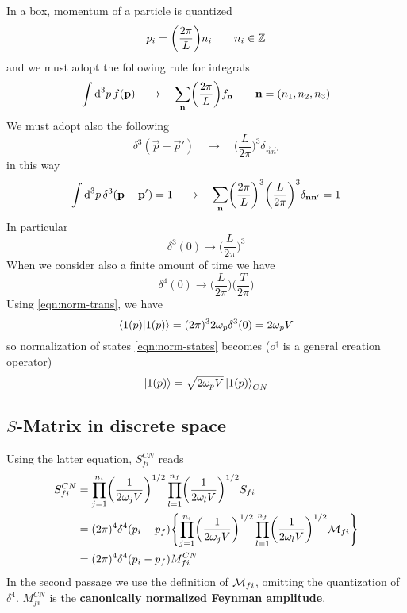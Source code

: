 \documentclass[TheoreticalPhy_ModB.tex]{subfiles}
\begin{document}
In a box, momentum of a particle is quantized
\[
p_i = \biggl( \frac{2 \pi}{L} \biggr) n_i \qquad n_i \in \mathbb{Z}
\]
and we must adopt the following rule for integrals
\[
\int \textup{d}^3 p \, f(\mathbf{p}) \quad \to \quad \sum_{\mathbf{n}} \biggr( \frac{2 \pi}{L} \biggl) f_{\mathbf{n}}
\qquad \mathbf{n} = (n_1, n_2, n_3)
\]
We must adopt also the following
\[
\delta^3 (\vec{p} - \vec{p}')
\quad \to \quad
\biggl( \frac{L}{2 \pi} \biggr)^3 \delta_{\vec{n}\vec{n}'}
\]
in this way
\[
\int \textup{d}^3p \, \delta^3 (\mathbf{p} - \mathbf{p}') = 1
\quad \to \quad
\sum_{\mathbf{n}} \biggl( \frac{2 \pi}{L} \biggr)^3 \biggl( \frac{L}{2 \pi} \biggr)^3 \delta_{\mathbf{n}\mathbf{n}'} = 1
\]
In particular
\[
\delta^3(0) \to \biggl( \frac{L}{2 \pi} \biggr)^3 
\]
When we consider also a finite amount of time we have
\[
\delta^4 (0) \to \biggl( \frac{L}{2 \pi} \biggr) \biggl( \frac{T}{2 \pi} \biggr)
\]
Using \eqref{eqn:norm-trans}, we have
\[
\braket{1(p)}{1(p)} = (2 \pi)^3 2 \omega_p \delta^3(0) = 2 \omega_p V 
\]
so normalization of states \eqref{eqn:norm-states} becomes ($o^\dagger$ is a general creation operator)
\[
\ket{1(p)} =  \sqrt{2 \omega_p V} \ket{1(p)}_{CN}
\]

\subsection{$S$-Matrix in discrete space}
Using the latter equation, $S_{fi}^{CN}$ reads
\[
\begin{split}
S_{fi}^{CN}	& = \prod_{j=1}^{n_i} \biggl( \frac{1}{2 \omega_j V} \biggr)^{1/2} \prod_{l=1}^{n_f} \biggl( \frac{1}{2\omega_l V} \biggr)^{1/2} S_{fi}\\
			& = (2 \pi)^4 \delta^4 (p_i - p_f)
				\Biggl\{ \prod_{j=1}^{n_i} \biggl( \frac{1}{2 \omega_j V} \biggr)^{1/2}
					    \prod_{l=1}^{n_f} \biggl( \frac{1}{2 \omega_l V} \biggr)^{1/2}
				\mathcal{M}_{fi} \Biggr\} \\
			& = (2 \pi)^4 \delta^4 (p_i - p_f) M_{fi}^{CN}
\end{split}
\]
In the second passage we use the definition of $\mathcal{M}_{fi}$, omitting the quantization of $\delta^4$.
$M_{fi}^{CN}$ is the \textbf{canonically normalized Feynman amplitude}.
\end{document}
